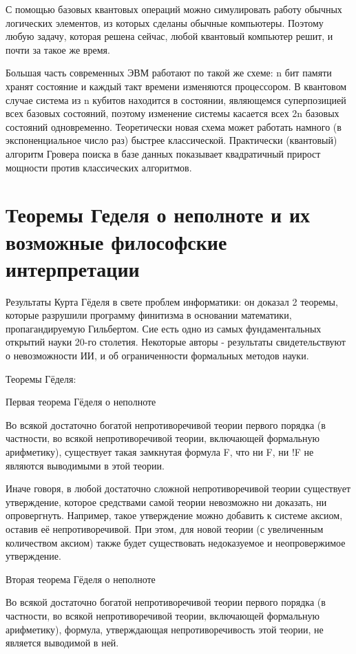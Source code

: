 \documentclass[12pt, specialist, subf, substylefile = spbu.rtx]{disser}
\begin{document}
С помощью базовых квантовых операций можно симулировать работу обычных логических элементов, из которых сделаны обычные компьютеры. Поэтому любую задачу, которая решена сейчас, любой квантовый компьютер решит, и почти за такое же время.

Большая часть современных ЭВМ работают по такой же схеме: n бит памяти хранят состояние и каждый такт времени изменяются процессором. В квантовом случае система из n кубитов находится в состоянии, являющемся суперпозицией всех базовых состояний, поэтому изменение системы касается всех 2n базовых состояний одновременно. Теоретически новая схема может работать намного (в экспоненциальное число раз) быстрее классической. Практически (квантовый) алгоритм Гровера поиска в базе данных показывает квадратичный прирост мощности против классических алгоритмов.


\section{Теоремы Геделя о неполноте и их возможные философские интерпретации}

Результаты Курта Гёделя в свете проблем информатики: он доказал 2 теоремы, которые разрушили программу финитизма в основании математики, пропагандируемую Гильбертом. Сие есть одно из самых фундаментальных открытий науки 20-го столетия. Некоторые авторы - результаты свидетельствуют о невозможности ИИ, и об ограниченности формальных методов науки.

Теоремы Гёделя:

Первая теорема Гёделя о неполноте

Во всякой достаточно богатой непротиворечивой теории первого порядка (в частности, во всякой непротиворечивой теории, включающей формальную арифметику), существует такая замкнутая формула F, что ни F, ни !F не являются выводимыми в этой теории.

Иначе говоря, в любой достаточно сложной непротиворечивой теории существует утверждение, которое средствами самой теории невозможно ни доказать, ни опровергнуть. Например, такое утверждение можно добавить к системе аксиом, оставив её непротиворечивой. При этом, для новой теории (с увеличенным количеством аксиом) также будет существовать недоказуемое и неопровержимое утверждение.

Вторая теорема Гёделя о неполноте

Во всякой достаточно богатой непротиворечивой теории первого порядка (в частности, во всякой непротиворечивой теории, включающей формальную арифметику), формула, утверждающая непротиворечивость этой теории, не является выводимой в ней.
\end{document}
